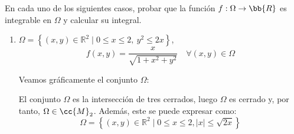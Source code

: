 \begin{ejercicio}\label{ej:2.4.2}
    En cada uno de los siguientes casos, probar que la función \( f:\Omega\to \bb{R} \) es integrable en \( \Omega \) y calcular su integral.
    \begin{enumerate}
        \item \(\Omega = \left\{ (x, y) \in \mathbb{R}^2 \mid 0 \leq x \leq 2,~y^2 \leq 2x \right\} \),
        \[ f(x, y) = \frac{x}{\sqrt{1 + x^2 + y^2}} \quad \forall (x, y) \in \Omega \]

        Veamos gráficamente el conjunto $\Omega$:
        \begin{figure}[H]
            \centering
        \end{figure}

        El conjunto $\Omega$ es la intersección de tres cerrados, luego $\Omega$ es cerrado y, por tanto, $\Omega\in \cc{M}_2$.
        Además, este se puede expresar como:
        \[ \Omega = \left\{ (x, y) \in \mathbb{R}^2 \mid 0 \leq x \leq 2,|x| \leq \sqrt{2x} \right\} \]


\end{enumerate}
\end{ejercicio}
